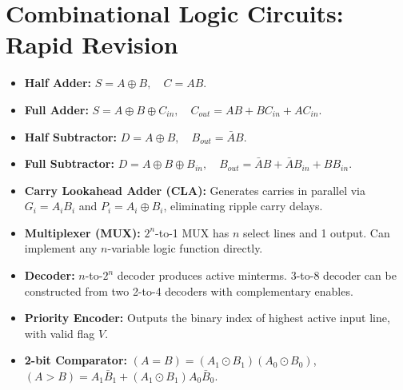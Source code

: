 \chapter{Combinational Logic Circuits: Rapid Revision}

\begin{highyieldbox}
\begin{itemize}[leftmargin=*]
    \item \textbf{Half Adder:} $S = A \oplus B, \quad C = AB$.
    \item \textbf{Full Adder:} $S = A \oplus B \oplus C_{in}, \quad C_{out} = AB + BC_{in} + AC_{in}$.
    \item \textbf{Half Subtractor:} $D = A \oplus B, \quad B_{out} = \bar{A}B$.
    \item \textbf{Full Subtractor:} $D = A \oplus B \oplus B_{in}, \quad B_{out} = \bar{A}B + \bar{A}B_{in} + BB_{in}$.
    \item \textbf{Carry Lookahead Adder (CLA):} Generates carries in parallel via $G_i = A_i B_i$ and $P_i = A_i \oplus B_i$, eliminating ripple carry delays.
    \item \textbf{Multiplexer (MUX):} $2^n$-to-1 MUX has $n$ select lines and 1 output. Can implement any $n$-variable logic function directly.
    \item \textbf{Decoder:} $n$-to-$2^n$ decoder produces active minterms. 3-to-8 decoder can be constructed from two 2-to-4 decoders with complementary enables.
    \item \textbf{Priority Encoder:} Outputs the binary index of highest active input line, with valid flag $V$.
    \item \textbf{2-bit Comparator:} $(A=B) = (A_1 \odot B_1)(A_0 \odot B_0)$, $(A>B) = A_1\bar{B}_1 + (A_1 \odot B_1)A_0\bar{B}_0$.
\end{itemize}
\end{highyieldbox}
